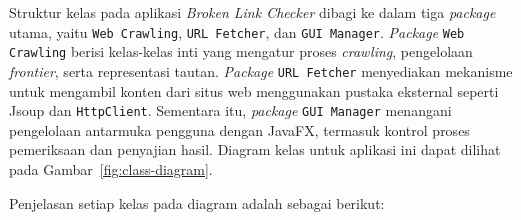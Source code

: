 
Struktur kelas pada aplikasi \textit{Broken Link Checker} dibagi ke dalam tiga \textit{package} utama, yaitu \texttt{Web Crawling}, \texttt{URL Fetcher}, dan \texttt{GUI Manager}. \textit{Package} \texttt{Web Crawling} berisi kelas-kelas inti yang mengatur proses \textit{crawling}, pengelolaan \textit{frontier}, serta representasi tautan. \textit{Package} \texttt{URL Fetcher} menyediakan mekanisme untuk mengambil konten dari situs web menggunakan pustaka eksternal seperti Jsoup dan \texttt{HttpClient}. Sementara itu, \textit{package} \texttt{GUI Manager} menangani pengelolaan antarmuka pengguna dengan JavaFX, termasuk kontrol proses pemeriksaan dan penyajian hasil. Diagram kelas untuk aplikasi ini dapat dilihat pada Gambar~\ref{fig:class-diagram}.

Penjelasan setiap kelas pada diagram adalah sebagai berikut:

